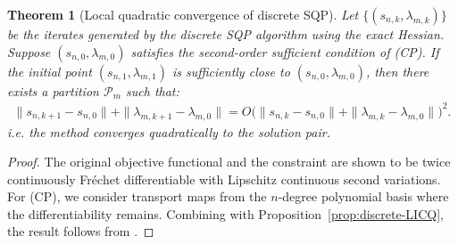 \documentclass[12pt,leqno]{amsart}
\newtheorem{theorem}{Theorem}
\begin{document}

\begin{theorem}[Local quadratic convergence of discrete SQP]
\label{thm:SQP_quad}
Let $\{(s_{n,k}, \lambda_{m,k})\}$ be the iterates generated by the discrete SQP algorithm using the exact Hessian. Suppose $(s_{n,0}, \lambda_{m,0})$ satisfies the second-order sufficient condition of \textnormal{(CP)}. If the initial point $(s_{n,1}, \lambda_{m,1})$ is sufficiently close to $(s_{n,0}, \lambda_{m,0})$, then there exists a partition $\mathcal{P}_m$ such that:
\begin{align*}
\|s_{n,k+1}-s_{n,0}\| + \|\lambda_{m,k+1}-\lambda_{m,0}\| = O\bigl( \|s_{n,k}-s_{n,0}\| + \|\lambda_{m,k}-\lambda_{m,0}\| \bigr)^2.
\end{align*}
i.e. the method converges quadratically to the solution pair.
\end{theorem}

\begin{proof}
The original objective functional and the constraint are shown to be twice continuously Fr\'echet differentiable with Lipschitz continuous second variations. For \textnormal{(CP)}, we consider transport maps from the $n$-degree polynomial basis where the differentiability remains. Combining with Proposition~\ref{prop:discrete-LICQ},
the result follows from \cite[Theorem 18.4]{wright1999numerical}.
\end{proof}
\end{document}
